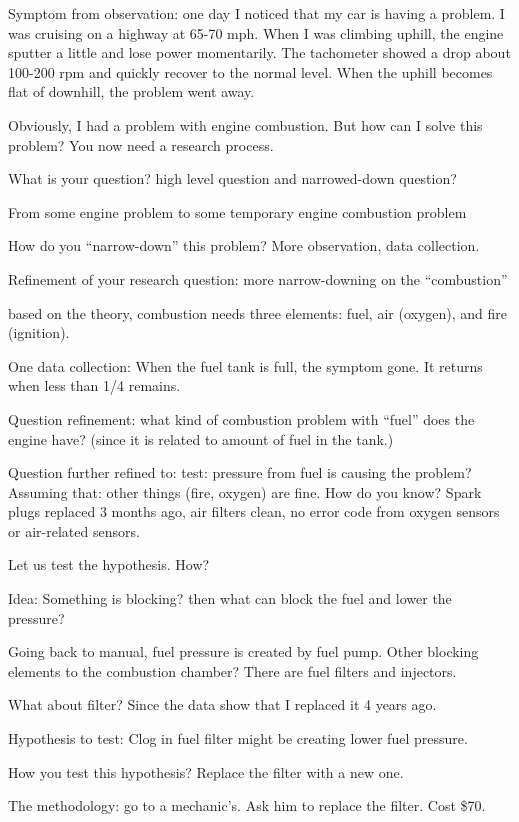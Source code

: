 \documentclass[11pt]{article}
\begin{document}
Symptom from observation: one day I noticed that my car is having a problem. I
was cruising on a highway at 65-70 mph. When I was climbing uphill, the engine
sputter a little and lose power momentarily. The tachometer showed a drop
about 100-200 rpm and quickly recover to the normal level. When the uphill
becomes flat of downhill, the problem went away.

Obviously, I had a problem with engine combustion. But how can I solve this
problem? You now need a research process.

What is your question? high level question and narrowed-down question?

From some engine problem to some temporary engine combustion problem 

How do you ``narrow-down'' this problem? More observation, data collection.

Refinement of your research question: more narrow-downing on the
``combustion''

based on the theory, combustion needs three elements: fuel, air (oxygen), and
fire (ignition).

One data collection: When the fuel tank is full, the symptom gone. It returns
when less than 1/4 remains.

Question refinement: what kind of combustion problem with ``fuel'' does the
engine have? (since it is related to amount of fuel in the tank.)

Question further refined to: test: pressure from fuel is causing the problem?
Assuming that: other things (fire, oxygen) are fine. How do you know? Spark
plugs replaced 3 months ago, air filters clean, no error code from oxygen
sensors or air-related sensors.

Let us test the hypothesis. How?

Idea: Something is blocking? then what can block the fuel and lower the
pressure? 

Going back to manual, fuel pressure is created by fuel pump. Other blocking
elements to the combustion chamber? There are fuel filters and injectors.

What about filter? Since the data show that I replaced it 4 years ago.

Hypothesis to test: Clog in fuel filter might be creating lower fuel pressure.

How you test this hypothesis? Replace the filter with a new one.

The methodology: go to a mechanic's. Ask him to replace the filter. Cost \$70.
\end{document}
